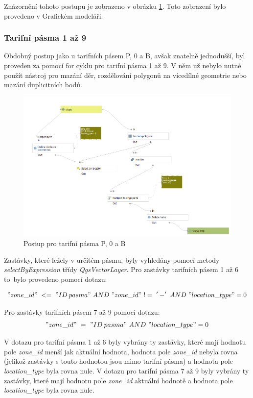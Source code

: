 Znázornění tohoto postupu je zobrazeno v obrázku \ref{fig:postup-voronoi-P0B}. Toto zobrazení bylo provedeno v Grafickém modeláři.

\subsubsection{Tarifní pásma 1 až 9}
\label{tp_1az9}

Obdobný postup jako u tarifních pásem P, 0 a B, avšak znatelně jednodušší, byl proveden za pomocí
for cyklu pro tarifní pásma 1 až 9. V něm už nebylo nutné použít nástroj pro mazání děr, rozdělování polygonů
na vícedílné geometrie nebo mazání duplicitních bodů. 

\begin{figure}[H] \centering
    \includegraphics[width=400pt]{./pictures/postup-voronoi-P0B.png}
    \caption[Postup pro tarifní pásma P, 0 a B]{Postup pro tarifní pásma P, 0 a B}
	\label{fig:postup-voronoi-P0B}              
\end{figure}

Zastávky, které ležely v určitém pásmu, byly vyhledány pomocí metody \textit{selectByExpression} třídy 
\textit{QgsVectorLayer}. Pro zastávky tarifních pásem 1 až 6 to~bylo provedeno pomocí dotazu:

\["zone\_id"\ <=\ "ID\: pasma"\ AND\ "zone\_id"\ !=\ '-'\ AND\ "location\_type" = 0\]  

Pro zastávky tarifních pásem 7 až 9 pomocí dotazu:
\["zone\_id"\ =\ "ID\: pasma"\ AND\ "location\_type" = 0\] 

V dotazu pro tarifní pásma 1 až 6 byly vybrány ty zastávky, které mají hodnotu pole \textit{zone\_id} menší jak aktuální hodnota,
hodnota pole \textit{zone\_id} nebyla rovna  (jelikož zastávky s touto hodnotou jsou mimo tarifní pásma)
a hodnota pole \textit{location\_type} byla rovna nule. V dotazu pro tarifní pásma 7 až 9 byly vybrány ty zastávky,
které mají hodnotu pole \textit{zone\_id} aktuální hodnotě a hodnota pole \textit{location\_type} byla rovna nule.

